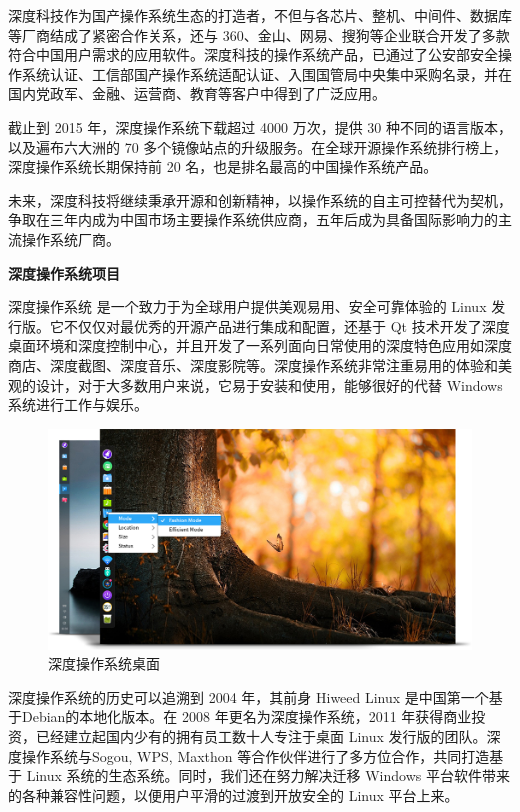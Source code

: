 \documentclass[doctor,openright,twoside]{sjtuthesis}
\theoremstyle{plain}
\theoremstyle{definition}
\theoremstyle{remark}
\theoremstyle{ocrenumbox}
\theoremstyle{plain}
\begin{document}
深度科技作为国产操作系统生态的打造者，不但与各芯片、整机、中间件、数据库等厂商结成了紧密合作关系，还与 360、金山、网易、搜狗等企业联合开发了多款符合中国用户需求的应用软件。深度科技的操作系统产品，已通过了公安部安全操作系统认证、工信部国产操作系统适配认证、入围国管局中央集中采购名录，并在国内党政军、金融、运营商、教育等客户中得到了广泛应用。

截止到 2015 年，深度操作系统下载超过 4000 万次，提供 30 种不同的语言版本，以及遍布六大洲的 70 多个镜像站点的升级服务。在全球开源操作系统排行榜上，深度操作系统长期保持前 20 名，也是排名最高的中国操作系统产品。

未来，深度科技将继续秉承开源和创新精神，以操作系统的自主可控替代为契机，争取在三年内成为中国市场主要操作系统供应商，五年后成为具备国际影响力的主流操作系统厂商。

\textbf{深度操作系统项目}

深度操作系统 是一个致力于为全球用户提供美观易用、安全可靠体验的 Linux 发行版。它不仅仅对最优秀的开源产品进行集成和配置，还基于 Qt 技术开发了深度桌面环境和深度控制中心，并且开发了一系列面向日常使用的深度特色应用如深度商店、深度截图、深度音乐、深度影院等。深度操作系统非常注重易用的体验和美观的设计，对于大多数用户来说，它易于安装和使用，能够很好的代替 Windows 系统进行工作与娱乐。

\begin{figure}
\includegraphics{en_about-us_content_sys} \caption[深度操作系统桌面]{深度操作系统桌面}\label{fig:deepin-os}
\end{figure}

深度操作系统的历史可以追溯到 2004 年，其前身 Hiweed Linux 是中国第一个基于Debian的本地化版本。在 2008 年更名为深度操作系统，2011 年获得商业投资，已经建立起国内少有的拥有员工数十人专注于桌面 Linux 发行版的团队。深度操作系统与Sogou, WPS, Maxthon 等合作伙伴进行了多方位合作，共同打造基于 Linux 系统的生态系统。同时，我们还在努力解决迁移 Windows 平台软件带来的各种兼容性问题，以便用户平滑的过渡到开放安全的 Linux 平台上来。
\end{document}
